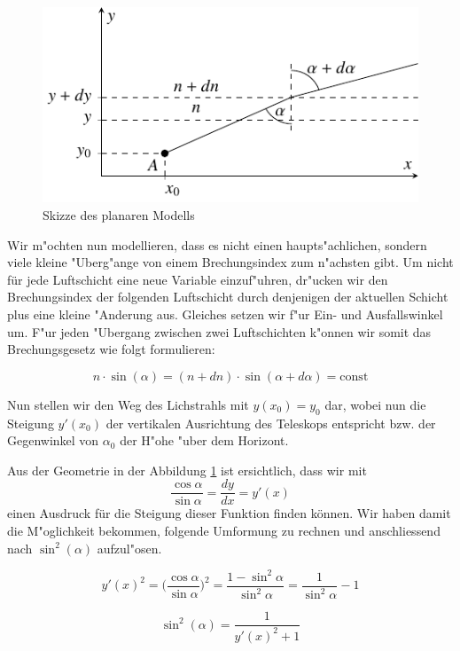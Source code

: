 \begin{refsection}
\begin{figure}
\centering
\includegraphics{licht/standalone/fig_planar_skizze.pdf}
\caption{Skizze des planaren Modells}
\label{fig:13_1}
\end{figure}

Wir m"ochten nun modellieren, dass es nicht einen haupts"achlichen, sondern viele kleine "Uberg"ange von einem Brechungsindex zum n"achsten gibt. 
Um nicht für jede Luftschicht eine neue Variable einzuf"uhren, dr"ucken wir den Brechungsindex der folgenden Luftschicht durch denjenigen der aktuellen Schicht plus eine kleine "Anderung aus. 
Gleiches setzen wir f"ur Ein- und Ausfallswinkel um. 
F"ur jeden "Ubergang zwischen zwei Luftschichten k"onnen wir somit das Brechungsgesetz wie folgt formulieren:

\begin{equation} \label{eq:13_1}
  n \cdot \sin(\alpha) = (n + dn) \cdot \sin(\alpha + d\alpha) = \text{const}
\end{equation}

Nun stellen wir den Weg des Lichstrahls mit $y(x_0) = y_0$ dar, wobei nun die Steigung $y'(x_0)$ der vertikalen Ausrichtung des Teleskops entspricht bzw. der Gegenwinkel von  $\alpha_0$ der H"ohe "uber dem Horizont.

Aus der Geometrie in der Abbildung \ref{fig:13_1} ist ersichtlich, dass wir mit 
$$\frac{\cos \alpha}{\sin \alpha} = \frac{dy}{dx} = y'(x)$$
einen Ausdruck für die Steigung dieser Funktion finden können. 
Wir haben damit die M"oglichkeit bekommen, folgende Umformung zu rechnen und anschliessend nach $\sin^2(\alpha)$ aufzul"osen.

$$ y'(x)^2 = \biggl(\frac{\cos \alpha}{\sin \alpha}\biggr)^2 = \frac{1 - \sin^2 \alpha}{\sin^2 \alpha} = \frac{1}{\sin^2 \alpha} - 1$$

\begin{equation} \label{eq:13_2}
\sin^2 (\alpha) = \frac{1}{y'(x)^2 + 1}
\end{equation}


\end{refsection}
